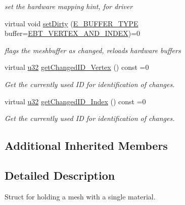 \begin{DoxyCompactItemize}
\begin{DoxyCompactList}\small\item\em set the hardware mapping hint, for driver \end{DoxyCompactList}\item 
\mbox{\label{classirr_1_1scene_1_1IMeshBuffer_a21c9395d9751082ce3feecf33351f918}} 
virtual void \hyperlink{classirr_1_1scene_1_1IMeshBuffer_a21c9395d9751082ce3feecf33351f918}{set\+Dirty} (\hyperlink{namespaceirr_1_1scene_a8f59a89ffef0ad8e5b2c2cb874a93e8c}{E\+\_\+\+B\+U\+F\+F\+E\+R\+\_\+\+T\+Y\+PE} buffer=\hyperlink{namespaceirr_1_1scene_a8f59a89ffef0ad8e5b2c2cb874a93e8ca833624730c30cffccc121fe31aa0832c}{E\+B\+T\+\_\+\+V\+E\+R\+T\+E\+X\+\_\+\+A\+N\+D\+\_\+\+I\+N\+D\+EX})=0
\begin{DoxyCompactList}\small\item\em flags the meshbuffer as changed, reloads hardware buffers \end{DoxyCompactList}\item 
virtual \hyperlink{namespaceirr_a0416a53257075833e7002efd0a18e804}{u32} \hyperlink{classirr_1_1scene_1_1IMeshBuffer_aba48df31edf92a0117692c0be02298db}{get\+Changed\+I\+D\+\_\+\+Vertex} () const =0
\begin{DoxyCompactList}\small\item\em Get the currently used ID for identification of changes. \end{DoxyCompactList}\item 
virtual \hyperlink{namespaceirr_a0416a53257075833e7002efd0a18e804}{u32} \hyperlink{classirr_1_1scene_1_1IMeshBuffer_acc389d76856dfb06c3ba45a92315e6d8}{get\+Changed\+I\+D\+\_\+\+Index} () const =0
\begin{DoxyCompactList}\small\item\em Get the currently used ID for identification of changes. \end{DoxyCompactList}\end{DoxyCompactItemize}
\subsection*{Additional Inherited Members}


\subsection{Detailed Description}
Struct for holding a mesh with a single material. 

